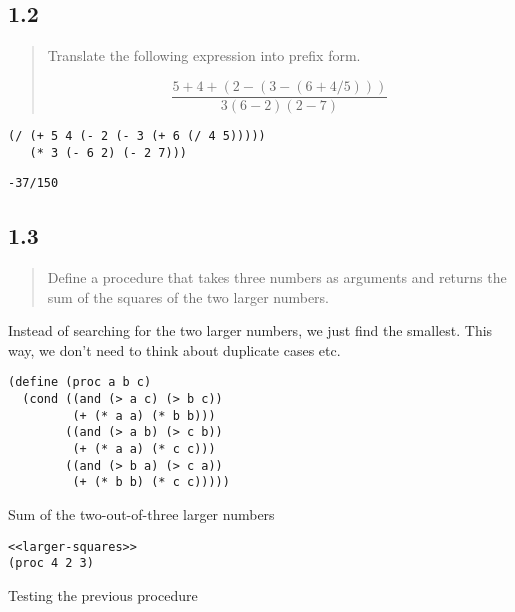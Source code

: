 \documentclass[a4paper, titlepage, twoside]{article}
\begin{document}
\subsection*{1.2}
\label{sec:orga759c6d}

\begin{quote}
Translate the following expression into prefix form.

\begin{equation}
\label{eq:1}
\frac{5+4+(2 - (3 - (6 + 4/5)))}{3(6-2)(2-7)}
\end{equation}
\end{quote}

\begin{verbatim}
(/ (+ 5 4 (- 2 (- 3 (+ 6 (/ 4 5)))))
   (* 3 (- 6 2) (- 2 7)))
\end{verbatim}

\begin{verbatim}
-37/150
\end{verbatim}

\subsection*{1.3}
\label{sec:orgb64a452}

\begin{quote}
Define a procedure that takes three numbers as arguments and returns the sum of the squares of the two larger numbers.
\end{quote}

Instead of searching for the two larger numbers, we just find the smallest. This way, we don't need to think about duplicate cases etc.

\begin{listing}[htbp]
\begin{verbatim}
(define (proc a b c)
  (cond ((and (> a c) (> b c))
         (+ (* a a) (* b b)))
        ((and (> a b) (> c b))
         (+ (* a a) (* c c)))
        ((and (> b a) (> c a))
         (+ (* b b) (* c c)))))
\end{verbatim}
\caption{\label{lst:orga504e12}Sum of the two-out-of-three larger numbers}
\end{listing}

\begin{listing}[H]
\begin{verbatim}
<<larger-squares>>
(proc 4 2 3)
\end{verbatim}
\caption{Testing the previous procedure}
\end{listing}
\end{document}
